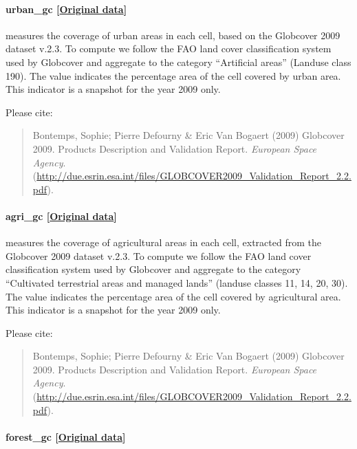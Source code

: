 \documentclass[]{book}
\begin{document}
\paragraph{urban\_gc
{[}\href{http://due.esrin.esa.int/page_globcover.php}{Original
data}{]}}\label{urban-gc}

measures the coverage of urban areas in each cell, based on the
Globcover 2009 dataset v.2.3. To compute  we follow
the FAO land cover classification system used by Globcover and aggregate
to the category ``Artificial areas'' (Landuse class 190). The value
indicates the percentage area of the cell covered by urban area. This
indicator is a snapshot for the year 2009 only.

Please cite:

\begin{quote}
Bontemps, Sophie; Pierre Defourny \& Eric Van Bogaert (2009) Globcover
2009. Products Description and Validation Report. \emph{European Space
Agency}.
(\url{http://due.esrin.esa.int/files/GLOBCOVER2009_Validation_Report_2.2.pdf}).
\end{quote}

\paragraph{agri\_gc
{[}\href{http://due.esrin.esa.int/page_globcover.php}{Original
data}{]}}\label{agri-gc}

measures the coverage of agricultural areas in each cell, extracted from
the Globcover 2009 dataset v.2.3. To compute  we follow
the FAO land cover classification system used by Globcover and aggregate
to the category ``Cultivated terrestrial areas and managed lands''
(landuse classes 11, 14, 20, 30). The value indicates the percentage
area of the cell covered by agricultural area. This indicator is a
snapshot for the year 2009 only.

Please cite:

\begin{quote}
Bontemps, Sophie; Pierre Defourny \& Eric Van Bogaert (2009) Globcover
2009. Products Description and Validation Report. \emph{European Space
Agency}.
(\url{http://due.esrin.esa.int/files/GLOBCOVER2009_Validation_Report_2.2.pdf}).
\end{quote}

\paragraph{forest\_gc
{[}\href{http://due.esrin.esa.int/page_globcover.php}{Original
data}{]}}\label{forest-gc}
\end{document}

